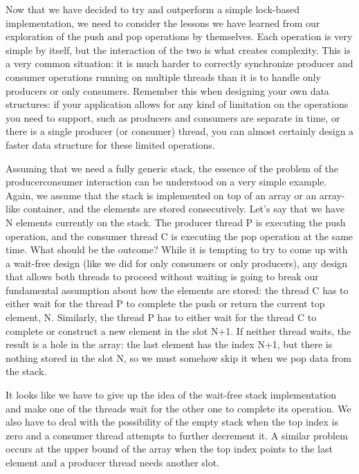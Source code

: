 
Now that we have decided to try and outperform a simple lock-based implementation, we need to consider the lessons we have learned from our exploration of the push and pop operations by themselves. Each operation is very simple by itself, but the interaction of the two is what creates complexity. This is a very common situation: it is much harder to correctly synchronize producer and consumer operations running on multiple threads than it is to handle only producers or only consumers. Remember this when designing your own data structures: if your application allows for any kind of limitation on the operations you need to support, such as producers and consumers are separate in time, or there is a single producer (or consumer) thread, you can almost certainly design a faster data structure for these limited operations.

Assuming that we need a fully generic stack, the essence of the problem of the producerconsumer interaction can be understood on a very simple example. Again, we assume that the stack is implemented on top of an array or an array-like container, and the elements are stored consecutively. Let's say that we have N elements currently on the stack. The producer thread P is executing the push operation, and the consumer thread C is executing the pop operation at the same time. What should be the outcome? While it is tempting to try to come up with a wait-free design (like we did for only consumers or only producers), any design that allows both threads to proceed without waiting is going to break our fundamental assumption about how the elements are stored: the thread C has to either wait for the thread P to complete the push or return the current top element, N. Similarly, the thread P has to either wait for the thread C to complete or construct a new element in the slot N+1. If neither thread waits, the result is a hole in the array: the last element has the index N+1, but there is nothing stored in the slot N, so we must somehow skip it when we pop data from the stack.

It looks like we have to give up the idea of the wait-free stack implementation and make one of the threads wait for the other one to complete its operation. We also have to deal with the possibility of the empty stack when the top index is zero and a consumer thread attempts to further decrement it. A similar problem occurs at the upper bound of the array when the top index points to the last element and a producer thread needs another slot.

